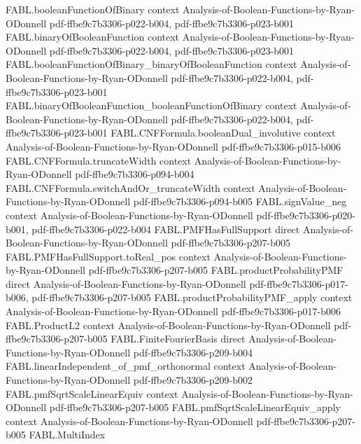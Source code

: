 \begin{theorem}
  {FABL.booleanFunctionOfBinary}
  {context}
  {Analysis-of-Boolean-Functions-by-Ryan-ODonnell}
  {pdf-ffbe9c7b3306-p022-b004,
    pdf-ffbe9c7b3306-p023-b001}
\proofstep
  {FABL.binaryOfBooleanFunction}
  {context}
  {Analysis-of-Boolean-Functions-by-Ryan-ODonnell}
  {pdf-ffbe9c7b3306-p022-b004,
    pdf-ffbe9c7b3306-p023-b001}
\proofstep
  {FABL.booleanFunctionOfBinary_binaryOfBooleanFunction}
  {context}
  {Analysis-of-Boolean-Functions-by-Ryan-ODonnell}
  {pdf-ffbe9c7b3306-p022-b004,
    pdf-ffbe9c7b3306-p023-b001}
\proofstep
  {FABL.binaryOfBooleanFunction_booleanFunctionOfBinary}
  {context}
  {Analysis-of-Boolean-Functions-by-Ryan-ODonnell}
  {pdf-ffbe9c7b3306-p022-b004,
    pdf-ffbe9c7b3306-p023-b001}
\proofstep
  {FABL.CNFFormula.booleanDual_involutive}
  {context}
  {Analysis-of-Boolean-Functions-by-Ryan-ODonnell}
  {pdf-ffbe9c7b3306-p015-b006}
\proofstep
  {FABL.CNFFormula.truncateWidth}
  {context}
  {Analysis-of-Boolean-Functions-by-Ryan-ODonnell}
  {pdf-ffbe9c7b3306-p094-b004}
\proofstep
  {FABL.CNFFormula.switchAndOr_truncateWidth}
  {context}
  {Analysis-of-Boolean-Functions-by-Ryan-ODonnell}
  {pdf-ffbe9c7b3306-p094-b005}
\proofstep
  {FABL.signValue_neg}
  {context}
  {Analysis-of-Boolean-Functions-by-Ryan-ODonnell}
  {pdf-ffbe9c7b3306-p020-b001,
    pdf-ffbe9c7b3306-p022-b004}
\proofstep
  {FABL.PMFHasFullSupport}
  {direct}
  {Analysis-of-Boolean-Functions-by-Ryan-ODonnell}
  {pdf-ffbe9c7b3306-p207-b005}
\proofstep
  {FABL.PMFHasFullSupport.toReal_pos}
  {context}
  {Analysis-of-Boolean-Functions-by-Ryan-ODonnell}
  {pdf-ffbe9c7b3306-p207-b005}
\proofstep
  {FABL.productProbabilityPMF}
  {direct}
  {Analysis-of-Boolean-Functions-by-Ryan-ODonnell}
  {pdf-ffbe9c7b3306-p017-b006,
    pdf-ffbe9c7b3306-p207-b005}
\proofstep
  {FABL.productProbabilityPMF_apply}
  {context}
  {Analysis-of-Boolean-Functions-by-Ryan-ODonnell}
  {pdf-ffbe9c7b3306-p017-b006}
\proofstep
  {FABL.ProductL2}
  {context}
  {Analysis-of-Boolean-Functions-by-Ryan-ODonnell}
  {pdf-ffbe9c7b3306-p207-b005}
\proofstep
  {FABL.FiniteFourierBasis}
  {direct}
  {Analysis-of-Boolean-Functions-by-Ryan-ODonnell}
  {pdf-ffbe9c7b3306-p209-b004}
\proofstep
  {FABL.linearIndependent_of_pmf_orthonormal}
  {context}
  {Analysis-of-Boolean-Functions-by-Ryan-ODonnell}
  {pdf-ffbe9c7b3306-p209-b002}
\proofstep
  {FABL.pmfSqrtScaleLinearEquiv}
  {context}
  {Analysis-of-Boolean-Functions-by-Ryan-ODonnell}
  {pdf-ffbe9c7b3306-p207-b005}
\proofstep
  {FABL.pmfSqrtScaleLinearEquiv_apply}
  {context}
  {Analysis-of-Boolean-Functions-by-Ryan-ODonnell}
  {pdf-ffbe9c7b3306-p207-b005}
\proofstep
  {FABL.MultiIndex}

\end{theorem}
